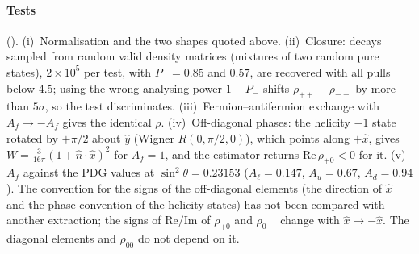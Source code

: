 \paragraph{Tests} ().
(i)~Normalisation and the two shapes quoted above.
(ii)~Closure: decays sampled from random valid density matrices (mixtures of two random pure states), $2\times10^5$
per test, with $P_- = 0.85$ and $0.57$, are recovered with all pulls below 4.5; using the wrong analysing power
$1 - P_-$ shifts $\rho_{++} - \rho_{--}$ by more than $5\sigma$, so the test discriminates.
(iii)~Fermion--antifermion exchange with $A_f \to -A_f$ gives the identical $\rho$.
(iv)~Off-diagonal phases: the helicity $-1$ state rotated by $+\pi/2$ about $\hat y$ (Wigner $R(0,\pi/2,0)$), which
points along $+\hat x$, gives $W = \tfrac{3}{16\pi}(1 + \hat n\cdot\hat x)^2$ for $A_f = 1$, and the estimator returns
$\mathrm{Re}\,\rho_{+0} < 0$ for it.
(v)~$A_f$ against the PDG values at $\sin^2\theta = 0.23153$ ($A_\ell = 0.147$, $A_u = 0.67$, $A_d = 0.94$).
The convention for the signs of the off-diagonal elements (the direction of $\hat x$ and the phase convention of the
helicity states) has not been compared with another extraction; the signs of $\mathrm{Re}/\mathrm{Im}$ of
$\rho_{+0}$ and $\rho_{0-}$ change with $\hat x \to -\hat x$. The diagonal elements and $\rho_{00}$ do not depend on it.

